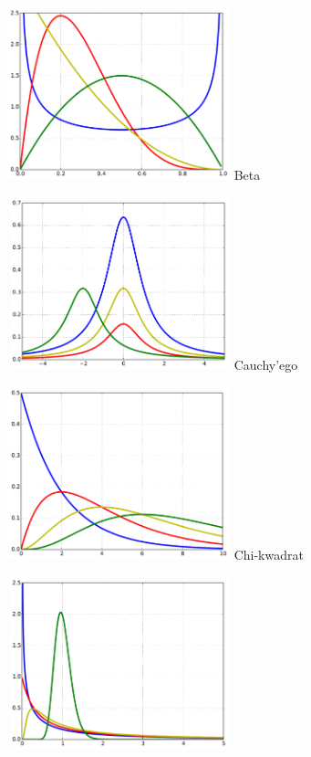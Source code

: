 \newpage

\begin{multicols}{3}
\begin{Figure} \centering
 \includegraphics[width=183pt, height=142pt]{img/beta}
 Beta
\end{Figure}
\begin{Figure} \centering
 \includegraphics[width=183pt, height=142pt]{img/cauchy}
 Cauchy'ego
\end{Figure}
\begin{Figure} \centering
 \includegraphics[width=183pt, height=142pt]{img/chi}
 Chi-kwadrat
\end{Figure}
\begin{Figure} \centering
 \includegraphics[width=183pt, height=142pt]{img/f}

\end{Figure}
\end{multicols}

